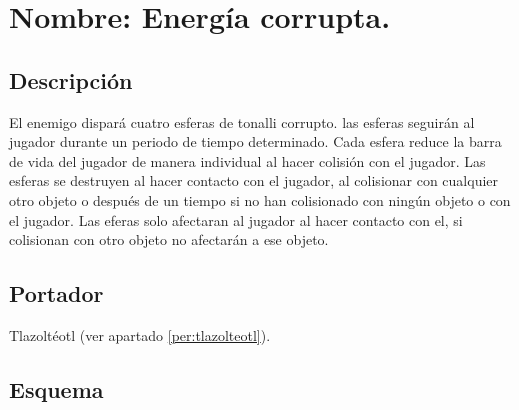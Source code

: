 \section{Nombre: Energía corrupta.} \label{hab.CorrupEner}
\subsection{Descripción}
El enemigo dispará cuatro esferas de tonalli corrupto. las esferas seguirán al jugador durante un periodo de tiempo determinado. Cada esfera reduce la barra de vida del jugador de manera individual al hacer colisión con el jugador. Las esferas se destruyen al hacer contacto con el jugador, al colisionar con cualquier otro objeto o después de un tiempo si no han colisionado con ningún objeto o con el jugador. Las eferas solo afectaran al jugador al hacer contacto con el, si colisionan con otro objeto no afectarán a ese objeto. 
\subsection{Portador}
Tlazoltéotl (ver apartado \ref{per:tlazolteotl}).
\subsection{Esquema}
			